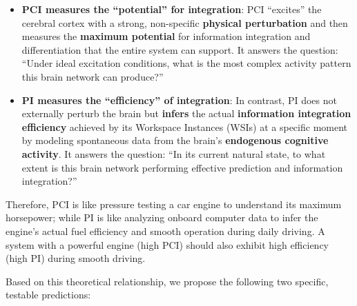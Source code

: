 \documentclass[
  a4paper]{article}
\providecommand{\tightlist}{%
  \setlength{\itemsep}{0pt}\setlength{\parskip}{0pt}}
\begin{document}
\begin{itemize}
\tightlist
\item
  \textbf{PCI measures the ``potential'' for integration}: PCI
  ``excites'' the cerebral cortex with a strong, non-specific
  \textbf{physical perturbation} and then measures the \textbf{maximum
  potential} for information integration and differentiation that the
  entire system can support. It answers the question: ``Under ideal
  excitation conditions, what is the most complex activity pattern this
  brain network can produce?''
\item
  \textbf{PI measures the ``efficiency'' of integration}: In contrast,
  PI does not externally perturb the brain but \textbf{infers} the
  actual \textbf{information integration efficiency} achieved by its
  Workspace Instances (WSIs) at a specific moment by modeling
  spontaneous data from the brain's \textbf{endogenous cognitive
  activity}. It answers the question: ``In its current natural state, to
  what extent is this brain network performing effective prediction and
  information integration?''
\end{itemize}

Therefore, PCI is like pressure testing a car engine to understand its
maximum horsepower; while PI is like analyzing onboard computer data to
infer the engine's actual fuel efficiency and smooth operation during
daily driving. A system with a powerful engine (high PCI) should also
exhibit high efficiency (high PI) during smooth driving.

Based on this theoretical relationship, we propose the following two
specific, testable predictions:
\end{document}
